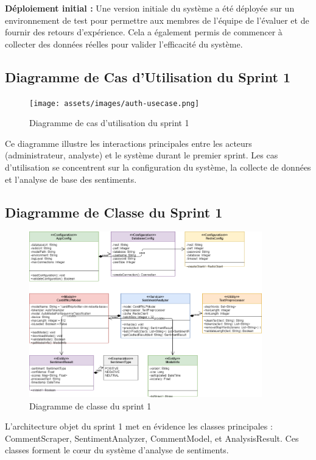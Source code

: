 \textbf{Déploiement initial :} Une version initiale du système a été déployée sur un environnement de test pour permettre aux membres de l'équipe de l'évaluer et de fournir des retours d'expérience. Cela a également permis de commencer à collecter des données réelles pour valider l'efficacité du système.

\subsection{Diagramme de Cas d'Utilisation du Sprint 1}

\begin{figure}[H]
\centering
\texttt{[image: assets/images/auth-usecase.png]} 
\caption{Diagramme de cas d'utilisation du sprint 1}
\label{fig:sprint1-usecase}
\end{figure}

Ce diagramme illustre les interactions principales entre les acteurs (administrateur, analyste) et le système durant le premier sprint. Les cas d'utilisation se concentrent sur la configuration du système, la collecte de données et l'analyse de base des sentiments.

\subsection{Diagramme de Classe du Sprint 1}

\begin{figure}[H]
\centering
\includegraphics[width=0.9\textwidth]{assets/images/sprint1-class.png}
\caption{Diagramme de classe du sprint 1}
\label{fig:sprint1-class}
\end{figure}

L'architecture objet du sprint 1 met en évidence les classes principales : CommentScraper, SentimentAnalyzer, CommentModel, et AnalysisResult. Ces classes forment le cœur du système d'analyse de sentiments.

